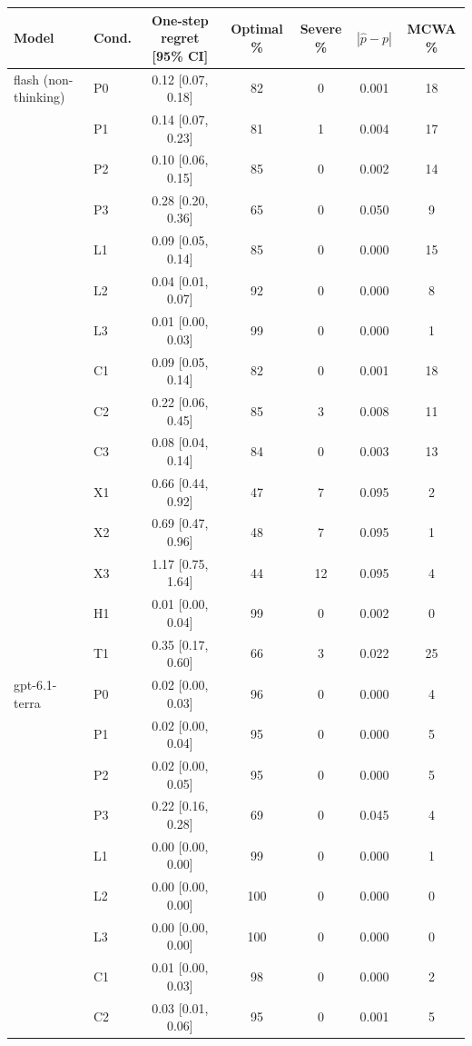 \begin{tabular}{@{}llccccc@{}}
\toprule
Model & Cond. & One-step regret [95\% CI] & Optimal \% & Severe \% & $|\hat p-p|$ & MCWA \% \\
\midrule
flash (non-thinking) & P0 & 0.12 [0.07, 0.18] & 82 & 0 & 0.001 & 18 \\
 & P1 & 0.14 [0.07, 0.23] & 81 & 1 & 0.004 & 17 \\
 & P2 & 0.10 [0.06, 0.15] & 85 & 0 & 0.002 & 14 \\
 & P3 & 0.28 [0.20, 0.36] & 65 & 0 & 0.050 & 9 \\
 & L1 & 0.09 [0.05, 0.14] & 85 & 0 & 0.000 & 15 \\
 & L2 & 0.04 [0.01, 0.07] & 92 & 0 & 0.000 & 8 \\
 & L3 & 0.01 [0.00, 0.03] & 99 & 0 & 0.000 & 1 \\
 & C1 & 0.09 [0.05, 0.14] & 82 & 0 & 0.001 & 18 \\
 & C2 & 0.22 [0.06, 0.45] & 85 & 3 & 0.008 & 11 \\
 & C3 & 0.08 [0.04, 0.14] & 84 & 0 & 0.003 & 13 \\
 & X1 & 0.66 [0.44, 0.92] & 47 & 7 & 0.095 & 2 \\
 & X2 & 0.69 [0.47, 0.96] & 48 & 7 & 0.095 & 1 \\
 & X3 & 1.17 [0.75, 1.64] & 44 & 12 & 0.095 & 4 \\
 & H1 & 0.01 [0.00, 0.04] & 99 & 0 & 0.002 & 0 \\
 & T1 & 0.35 [0.17, 0.60] & 66 & 3 & 0.022 & 25 \\
\midrule
gpt-6.1-terra & P0 & 0.02 [0.00, 0.03] & 96 & 0 & 0.000 & 4 \\
 & P1 & 0.02 [0.00, 0.04] & 95 & 0 & 0.000 & 5 \\
 & P2 & 0.02 [0.00, 0.05] & 95 & 0 & 0.000 & 5 \\
 & P3 & 0.22 [0.16, 0.28] & 69 & 0 & 0.045 & 4 \\
 & L1 & 0.00 [0.00, 0.00] & 99 & 0 & 0.000 & 1 \\
 & L2 & 0.00 [0.00, 0.00] & 100 & 0 & 0.000 & 0 \\
 & L3 & 0.00 [0.00, 0.00] & 100 & 0 & 0.000 & 0 \\
 & C1 & 0.01 [0.00, 0.03] & 98 & 0 & 0.000 & 2 \\
 & C2 & 0.03 [0.01, 0.06] & 95 & 0 & 0.001 & 5 \\

\end{tabular}
